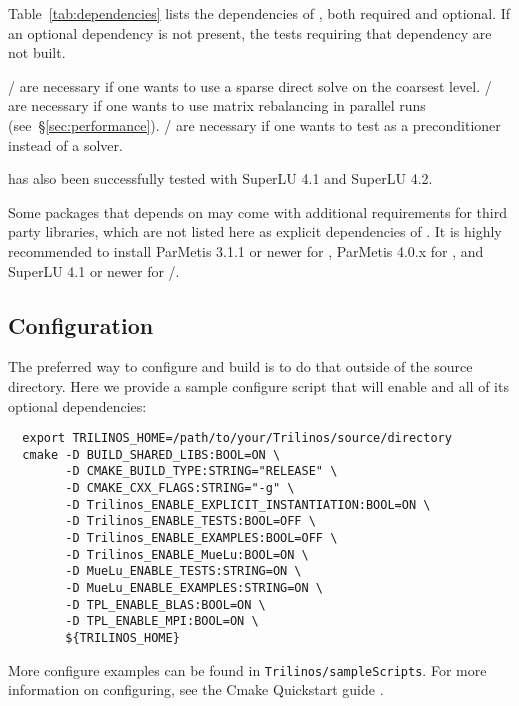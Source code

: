 Table~\ref{tab:dependencies} lists the dependencies of \muelu, both required and
optional. If an optional dependency is not present, the tests requiring that
dependency are not built.

\begin{mycomment}
\amesos{}/\amesostwo{} are necessary if one wants to use a sparse direct solve on the coarsest level.
\zoltan{}/\zoltantwo{} are necessary if one wants to use matrix rebalancing in parallel runs (see~\S\ref{sec:performance}).
\aztecoo{}/\belos{} are necessary if one wants to test \muelu{} as a preconditioner instead of a solver.
\end{mycomment}

\begin{mycomment}
\muelu{} has also been successfully tested with SuperLU 4.1 and SuperLU 4.2.
\end{mycomment}
\begin{mycomment}
Some packages that \muelu{} depends on may come with additional requirements for
third party libraries, which are not listed here as explicit dependencies of \muelu{}.
It is highly recommended to install ParMetis 3.1.1 or newer for \zoltan{},
ParMetis 4.0.x for \zoltantwo{}, and SuperLU 4.1 or newer for
\amesos{}/\amesostwo{}.
\end{mycomment}

\subsection{Configuration}
The preferred way to configure and build \muelu{} is to do that outside of the source directory.
Here we provide a sample configure script that will enable \muelu{} and all of its optional dependencies:
\begin{lstlisting}
  export TRILINOS_HOME=/path/to/your/Trilinos/source/directory
  cmake -D BUILD_SHARED_LIBS:BOOL=ON \
        -D CMAKE_BUILD_TYPE:STRING="RELEASE" \
        -D CMAKE_CXX_FLAGS:STRING="-g" \
        -D Trilinos_ENABLE_EXPLICIT_INSTANTIATION:BOOL=ON \
        -D Trilinos_ENABLE_TESTS:BOOL=OFF \
        -D Trilinos_ENABLE_EXAMPLES:BOOL=OFF \
        -D Trilinos_ENABLE_MueLu:BOOL=ON \
        -D MueLu_ENABLE_TESTS:STRING=ON \
        -D MueLu_ENABLE_EXAMPLES:STRING=ON \
        -D TPL_ENABLE_BLAS:BOOL=ON \
        -D TPL_ENABLE_MPI:BOOL=ON \
        ${TRILINOS_HOME}
\end{lstlisting}

\noindent
More configure examples can be found in \texttt{Trilinos/sampleScripts}.
For more information on configuring, see the \trilinos Cmake Quickstart guide \cite{TrilinosCmakeQuickStart}.

